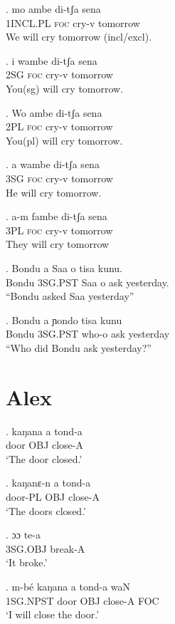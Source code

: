 \documentclass{assets/fieldnotes}
\begin{document}
\exg. mo ambe di-tʃa sena\\
1\textsc{INCL.PL} \textsc{foc} cry-v tomorrow\\
We will cry tomorrow (incl/excl).

\exg. i wambe di-tʃa sena\\
2\textsc{SG} \textsc{foc} cry-v tomorrow\\
You(sg) will cry tomorrow.

\exg. Wo ambe di-tʃa sena\\
2\textsc{PL} \textsc{foc} cry-v tomorrow\\
You(pl) will cry tomorrow.

\exg. a wambe di-tʃa sena\\
3\textsc{SG} \textsc{foc} cry-v tomorrow\\
He will cry tomorrow.

\exg. a-m fambe di-tʃa sena\\
3\textsc{PL} \textsc{foc} cry-v tomorrow\\
They will cry tomorrow


\exg. Bondu a Saa o tisa kunu.\\
Bondu 3SG.PST Saa o ask yesterday.\\
``Bondu asked Saa yesterday''

\exg. Bondu a ɲondo tisa kunu\\
Bondu 3SG.PST who-o ask yesterday\\
``Who did Bondu ask yesterday?''

\section{Alex}

\exg.
kaŋana   a            tond-a  \\
door     OBJ   close-A \\%
`The door closed.'

\exg.
kaŋanɛ-n   a            tond-a  \\
door-PL    OBJ   close-A \\%
`The doors closed.'

\exg.
ɔɔ        te-a    \\
3SG.OBJ   break-A \\%
`It broke.' \label{It broke}

\exg.
m-bé       kaŋana   a     tond-a    waN \\
1SG.NPST   door     OBJ   close-A   FOC \\%
`I will close the door.'
\end{document}
